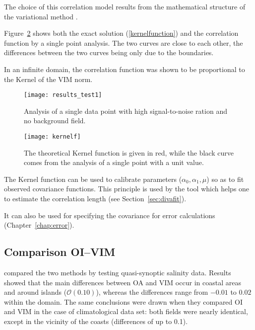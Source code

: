 The choice of this correlation model results from the mathematical structure of the variational method \citep{BRASSEUR96}.

Figure~\ref{kernel1} shows both the exact solution (\ref{kernelfunction}) and the correlation function by a single point analysis. The two curves are close to each other, the differences between the two curves being only due to the boundaries.

In an infinite domain, the correlation function was shown to be proportional to the Kernel of the VIM norm.

\begin{figure}[htpb]
	\centering
	\parbox{.6\textwidth}{
		\texttt{[image: results\_test1]}
		}\parbox{.4\textwidth}{
		\caption{Analysis of a single data point with high signal-to-noise ration and no background field.\label{singleanalysis}}}
\end{figure}

\begin{figure}[htpb]
	\centering
	\parbox{.6\textwidth}{
		\texttt{[image: kernelf]}
		}\parbox{.4\textwidth}{
		\caption{The theoretical Kernel function is given in red, while the black curve comes from the analysis of a single point with a unit value.\label{kernel1}}}
\end{figure}

The Kernel function can be used to calibrate \diva parameters ($\alpha_0, \alpha_1, \mu$) so as to fit observed covariance functions. This principle is used by the tool  which helps one to estimate the correlation length (see Section~\ref{sec:divafit}).

It can also be used for specifying the covariance for error calculations (Chapter~\ref{chap:error}).


\subsection{Comparison OI--VIM}

\citet{RIXEN00} compared the two methods by testing quasi-synoptic salinity data. Results showed that the main differences between OA and VIM occur in coastal areas and around islands ($\mathcal{O}(0.10)$), whereas the differences range from $-0.01$ to $0.02$ within the domain. The same conclusions were drawn when they compared OI and VIM in the case of climatological data set: both fields were nearly identical, except in the vicinity of the coasts (differences of up to 0.1).

